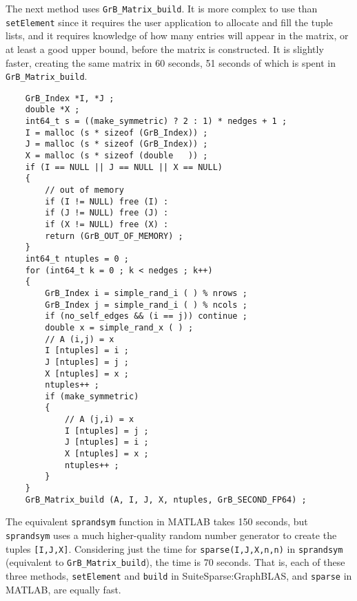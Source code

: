 \documentclass[12pt]{article}
\begin{document}
The next method uses \verb'GrB_Matrix_build'.  It is more complex to use than
\verb'setElement' since it requires the user application to allocate and fill
the tuple lists, and it requires knowledge of how many entries will appear in
the matrix, or at least a good upper bound, before the matrix is constructed.
It is slightly faster, creating the same matrix in 60 seconds, 51 seconds
of which is spent in \verb'GrB_Matrix_build'.

\newpage
    {\footnotesize
    \begin{verbatim}
    GrB_Index *I, *J ;
    double *X ;
    int64_t s = ((make_symmetric) ? 2 : 1) * nedges + 1 ;
    I = malloc (s * sizeof (GrB_Index)) ;
    J = malloc (s * sizeof (GrB_Index)) ;
    X = malloc (s * sizeof (double   )) ;
    if (I == NULL || J == NULL || X == NULL)
    {
        // out of memory
        if (I != NULL) free (I) :
        if (J != NULL) free (J) :
        if (X != NULL) free (X) :
        return (GrB_OUT_OF_MEMORY) ;
    }
    int64_t ntuples = 0 ;
    for (int64_t k = 0 ; k < nedges ; k++)
    {
        GrB_Index i = simple_rand_i ( ) % nrows ;
        GrB_Index j = simple_rand_i ( ) % ncols ;
        if (no_self_edges && (i == j)) continue ;
        double x = simple_rand_x ( ) ;
        // A (i,j) = x
        I [ntuples] = i ;
        J [ntuples] = j ;
        X [ntuples] = x ;
        ntuples++ ;
        if (make_symmetric)
        {
            // A (j,i) = x
            I [ntuples] = j ;
            J [ntuples] = i ;
            X [ntuples] = x ;
            ntuples++ ;
        }
    }
    GrB_Matrix_build (A, I, J, X, ntuples, GrB_SECOND_FP64) ; \end{verbatim}}

The equivalent \verb'sprandsym' function in MATLAB takes 150 seconds, but
\verb'sprandsym' uses a much higher-quality random number generator to create
the tuples \verb'[I,J,X]'.  Considering just the time for
\verb'sparse(I,J,X,n,n)' in \verb'sprandsym' (equivalent to
\verb'GrB_Matrix_build'), the time is 70 seconds.  That is, each of these three
methods, \verb'setElement' and \verb'build' in SuiteSparse:GraphBLAS, and
\verb'sparse' in MATLAB, are equally fast.

\end{document}
